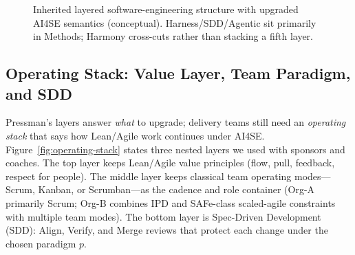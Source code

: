 \documentclass[10pt,conference]{IEEEtran}
\begin{document}
\begin{figure}[t]
\centering
{}
\caption{Inherited layered software-engineering structure with upgraded
AI4SE semantics (conceptual).
Harness/SDD/Agentic sit primarily in Methods; Harmony cross-cuts rather than
stacking a fifth layer.}
\label{fig:pressman-ai4se}
\end{figure}

\subsection{Operating Stack: Value Layer, Team Paradigm, and SDD}
\label{sec:operating-stack}

Pressman's layers answer \emph{what} to upgrade; delivery teams still need an
\emph{operating stack} that says how Lean/Agile work continues under AI4SE.
Figure~\ref{fig:operating-stack} states three nested layers we used with
sponsors and coaches.
The top layer keeps Lean/Agile value principles (flow, pull, feedback, respect
for people).
The middle layer keeps classical team operating modes---Scrum, Kanban, or
Scrumban---as the cadence and role container (Org-A primarily Scrum; Org-B
combines IPD and SAFe-class scaled-agile constraints with multiple team modes).
The bottom layer is Spec-Driven Development (SDD): Align, Verify, and Merge
reviews that protect each change under the chosen paradigm \(p\).
\end{document}
